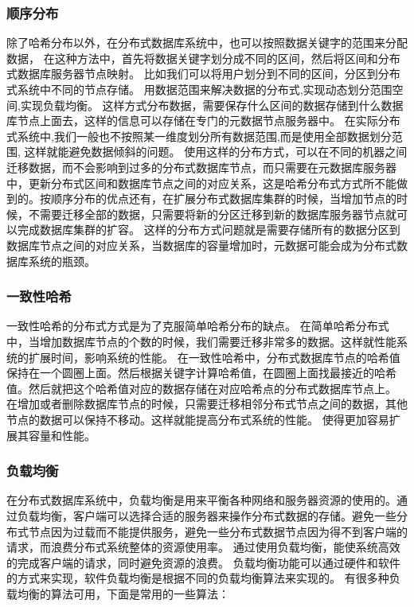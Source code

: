 \subsubsection{顺序分布}
除了哈希分布以外，在分布式数据库系统中，也可以按照数据关键字的范围来分配数据，
在这种方法中，首先将数据关键字划分成不同的区间，然后将区间和分布式数据库服务器节点映射。
比如我们可以将用户划分到不同的区间，分区到分布式系统中不同的节点存储。
用数据范围来解决数据的分布式,实现动态划分范围空间,实现负载均衡。 
这样方式分布数据，需要保存什么区间的数据存储到什么数据库节点上面去，这样的信息可以存储在专门的元数据节点服务器中。 
在实际分布式系统中,我们一般也不按照某一维度划分所有数据范围,而是使用全部数据划分范围,
这样就能避免数据倾斜的问题。 
使用这样的分布方式，可以在不同的机器之间迁移数据，而不会影响到过多的分布式数据库节点，而只需要在元数据库服务器中，更新分布式区间和数据库节点之间的对应关系，这是哈希分布式方式所不能做到的。按顺序分布的优点还有，在扩展分布式数据库集群的时候，当增加节点的时候，不需要迁移全部的数据，只需要将新的分区迁移到新的数据库服务器节点就可以完成数据库集群的扩容。
这样的分布方式问题就是需要存储所有的数据分区到数据库节点之间的对应关系，当数据库的容量增加时，元数据可能会成为分布式数据库系统的瓶颈。
\subsubsection{一致性哈希}
一致性哈希的分布式方式是为了克服简单哈希分布的缺点。
在简单哈希分布式中，当增加数据库节点的个数的时候，我们需要迁移非常多的数据。这样就性能系统的扩展时间，影响系统的性能。
在一致性哈希中，分布式数据库节点的哈希值保持在一个圆圈上面。然后根据关键字计算哈希值，在圆圈上面找最接近的哈希值。然后就把这个哈希值对应的数据存储在对应哈希点的分布式数据库节点上。
在增加或者删除数据库节点的时候，只需要迁移相邻分布式节点之间的数据，其他节点的数据可以保持不移动。这样就能提高分布式系统的性能。
使得更加容易扩展其容量和性能。 
\subsubsection{负载均衡}
在分布式数据库系统中，负载均衡是用来平衡各种网络和服务器资源的使用的。通过负载均衡，客户端可以选择合适的服务器来操作分布式数据的存储。避免一些分布式节点因为过载而不能提供服务，避免一些分布式数据节点因为得不到客户端的请求，而浪费分布式系统整体的资源使用率。
通过使用负载均衡，能使系统高效的完成客户端的请求，同时避免资源的浪费。
负载均衡功能可以通过硬件和软件的方式来实现，软件负载均衡是根据不同的负载均衡算法来实现的。
有很多种负载均衡的算法可用，下面是常用的一些算法：



